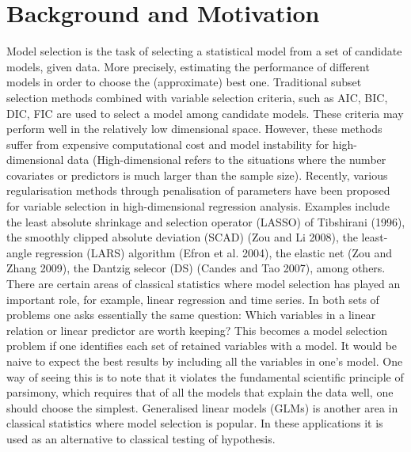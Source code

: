 \documentclass[a4paper,12pt,openany]{report}
\theoremstyle{plain}
\theoremstyle{plain}
\theoremstyle{plain}
\theoremstyle{plain}
\theoremstyle{plain}
\theoremstyle{plain}
\theoremstyle{plain}
\theoremstyle{plain}
\theoremstyle{plain}
\theoremstyle{plain}
\theoremstyle{plain}
\theoremstyle{plain}
\begin{document}
	\section{Background and Motivation}
	\noindent
Model selection is the task of selecting a statistical model from a set of candidate models, given data. More precisely, estimating the performance of different models in order to choose the (approximate) best one. Traditional subset selection methods combined with variable selection criteria, such as AIC, BIC, DIC, FIC are used to select a model among candidate models. These criteria may perform well in the relatively low dimensional space. However, these methods suffer from expensive computational cost and model instability for high-dimensional data (High-dimensional refers to the situations where the number covariates or predictors is much larger than the sample size). Recently, various regularisation methods through penalisation of parameters have been proposed for variable selection in high-dimensional regression analysis. Examples include the least absolute shrinkage and selection operator (LASSO) of Tibshirani (1996), the smoothly clipped absolute deviation (SCAD) (Zou and Li 2008), the least-angle regression (LARS) algorithm (Efron et al. 2004), the elastic net (Zou and Zhang 2009), the Dantzig selecor (DS) (Candes and Tao 2007), among others. \\

There are certain areas of classical statistics where model selection has played an important role, for example, linear regression and time series. In both sets of problems one asks essentially the same question: Which variables in a linear relation or linear predictor are worth keeping? This becomes a model selection problem if one identifies each set of retained variables with a model.	
It would be naive to expect the best results by including all the variables in one\textquoteright s model. One way of seeing this is to note that it violates the fundamental scientific principle of parsimony, which requires that of all the models that explain the data well, one should choose the simplest.
Generalised linear models (GLMs) is another area in classical statistics where model selection is popular. In these applications it is used as an alternative to classical testing of hypothesis.\\
\end{document}

